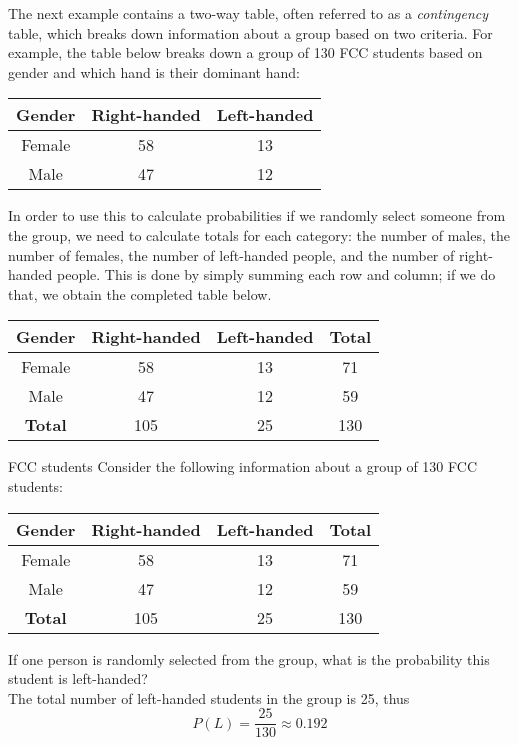 The next example contains a two-way table, often referred to as a \emph{contingency} table, which breaks down information about a group based on two criteria.  For example, the table below breaks down a group of 130 FCC students based on gender and which hand is their dominant hand:

\begin{center}
\begin{tabular}{|c|c|c|}
\hline
Gender & Right-handed & Left-handed \\ \hline 
Female & 58 & 13\\ \hline
Male & 47 & 12  \\ \hline
\end{tabular}
\end{center}

In order to use this to calculate probabilities if we randomly select someone from the group, we need to calculate totals for each category: the number of males, the number of females, the number of left-handed people, and the number of right-handed people.  This is done by simply summing each row and column; if we do that, we obtain the completed table below.

\begin{center}
\begin{tabular}{|c|c|c|c|}
\hline
Gender & Right-handed & Left-handed & \textbf{Total} \\ \hline 
Female & 58 & 13 & 71\\ \hline
Male & 47 & 12 & 59  \\ \hline
\textbf{Total} & 105 & 25 & 130 \\ \hline 
\end{tabular}
\end{center}

\begin{example}[https://www.youtube.com/watch?v=1aebOnTckVY]{FCC students}
Consider the following information about a group of 130 FCC students:

\begin{center}
\begin{tabular}{|c|c|c|c|}
\hline
Gender & Right-handed & Left-handed & \textbf{Total} \\ \hline 
Female & 58 & 13 & 71\\ \hline
Male & 47 & 12 & 59  \\ \hline
\textbf{Total} & 105 & 25 & 130 \\ \hline 
\end{tabular}
\end{center}

If one person is randomly selected from the group, what is the probability this student is left-handed? \\

 The total number of left-handed students in the group is 25, thus
\[  P(L) = \frac{25}{130} \approx 0.192 \]
\end{example}

